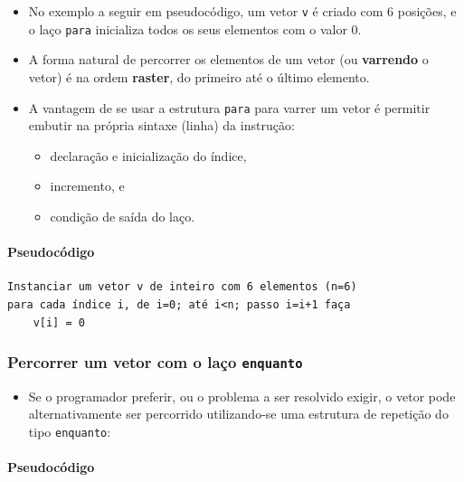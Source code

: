 \documentclass[12pt,a4paper]{article}
\providecommand{\tightlist}{%
      \setlength{\itemsep}{0pt}\setlength{\parskip}{0pt}}
\begin{document}
    \begin{itemize}
\tightlist
\item
  No exemplo a seguir em pseudocódigo, um vetor \texttt{v} é criado com
  6 posições, e o laço \texttt{para} inicializa todos os seus elementos
  com o valor 0.
\item
  A forma natural de percorrer os elementos de um vetor (ou
  \textbf{varrendo} o vetor) é na ordem \textbf{raster}, do primeiro até
  o último elemento.
\item
  A vantagem de se usar a estrutura \texttt{para} para varrer um vetor é
  permitir embutir na própria sintaxe (linha) da instrução:

  \begin{itemize}
  \tightlist
  \item
    declaração e inicialização do índice,
  \item
    incremento, e
  \item
    condição de saída do laço.
  \end{itemize}
\end{itemize}

    \hypertarget{pseudocuxf3digo}{%
\paragraph{Pseudocódigo}\label{pseudocuxf3digo}}

    \begin{verbatim}
Instanciar um vetor v de inteiro com 6 elementos (n=6)
para cada índice i, de i=0; até i<n; passo i=i+1 faça
    v[i] = 0
\end{verbatim}

    \hypertarget{percorrer-um-vetor-com-o-lauxe7o-enquanto}{%
\subsubsection{\texorpdfstring{Percorrer um vetor com o laço
\texttt{enquanto}}{Percorrer um vetor com o laço enquanto}}\label{percorrer-um-vetor-com-o-lauxe7o-enquanto}}

    \begin{itemize}
\tightlist
\item
  Se o programador preferir, ou o problema a ser resolvido exigir, o
  vetor pode alternativamente ser percorrido utilizando-se uma estrutura
  de repetição do tipo \texttt{enquanto}:
\end{itemize}

    \hypertarget{pseudocuxf3digo}{%
\paragraph{Pseudocódigo}\label{pseudocuxf3digo}}
\end{document}
